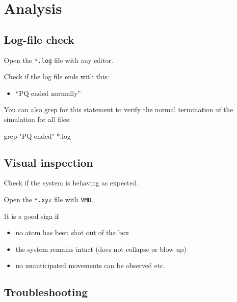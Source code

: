 \documentclass[
  letterpaper,
]{article}
\newenvironment{Shaded}{\begin{snugshade}}{\end{snugshade}}
\newcommand{\NormalTok}[1]{\textcolor[rgb]{0.00,0.23,0.31}{#1}}
\providecommand{\tightlist}{%
  \setlength{\itemsep}{0pt}\setlength{\parskip}{0pt}}\usepackage{longtable,booktabs,array}
\begin{document}
\hypertarget{analysis-1}{%
\section{Analysis}\label{analysis-1}}

\hypertarget{log-file-check}{%
\subsection{Log-file check}\label{log-file-check}}

Open the \texttt{*.log} file with any editor.

Check if the log file ends with this:

\begin{itemize}
\tightlist
\item[$\square$]
  ``PQ ended normally''
\end{itemize}

You can also grep for this statement to verify the normal termination of
the simulation for all files:

\begin{Shaded}
\begin{Highlighting}[]
\NormalTok{grep "PQ ended" *.log}
\end{Highlighting}
\end{Shaded}

\hypertarget{visual-inspection}{%
\subsection{Visual inspection}\label{visual-inspection}}

Check if the system is behaving as expected.

Open the \texttt{*.xyz} file with \texttt{VMD}.

It is a good sign if

\begin{itemize}
\item[$\square$]
  no atom has been shot out of the box
\item[$\square$]
  the system remains intact (does not collapse or blow up)
\item[$\square$]
  no unanticipated movements can be observed etc.
\end{itemize}

\hypertarget{troubleshooting}{%
\subsection*{Troubleshooting}\label{troubleshooting}}
\end{document}
